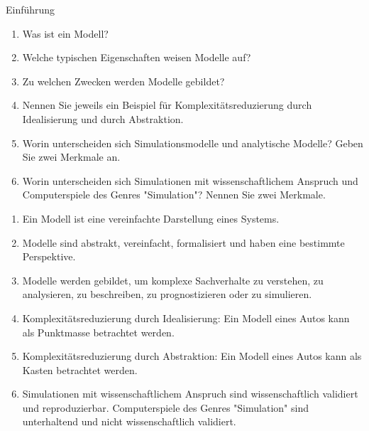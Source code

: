 \documentclass{article}
\author{Leopold Lemmermann}
\begin{document}
\createtitle

\begin{exercise}{Einführung}
  \begin{enumerate}
    \item Was ist ein Modell?
    \item Welche typischen Eigenschaften weisen Modelle auf?
    \item Zu welchen Zwecken werden Modelle gebildet?
    \item Nennen Sie jeweils ein Beispiel für Komplexitätsreduzierung durch Idealisierung und durch Abstraktion.
    \item Worin unterscheiden sich Simulationsmodelle und analytische Modelle? Geben Sie zwei Merkmale an.
    \item Worin unterscheiden sich Simulationen mit wissenschaftlichem Anspruch und Computerspiele des Genres "Simulation"? Nennen Sie zwei Merkmale.
  \end{enumerate}

  \begin{solution}
    \begin{enumerate}
      \item Ein Modell ist eine vereinfachte Darstellung eines Systems.
      \item Modelle sind abstrakt, vereinfacht, formalisiert und haben eine bestimmte Perspektive.
      \item Modelle werden gebildet, um komplexe Sachverhalte zu verstehen, zu analysieren, zu beschreiben, zu prognostizieren oder zu simulieren.
      \item Komplexitätsreduzierung durch Idealisierung: Ein Modell eines Autos kann als Punktmasse betrachtet werden.
      \item Komplexitätsreduzierung durch Abstraktion: Ein Modell eines Autos kann als Kasten betrachtet werden.
      \item Simulationen mit wissenschaftlichem Anspruch sind wissenschaftlich validiert und reproduzierbar. Computerspiele des Genres "Simulation" sind unterhaltend und nicht wissenschaftlich validiert.
    \end{enumerate}
  \end{solution}
\end{exercise}
\end{document}
